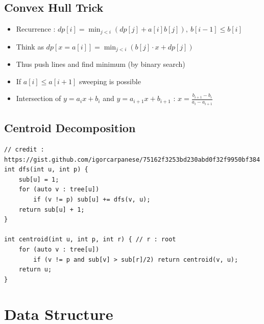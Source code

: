 \documentclass[landscape, 8pt, a4paper, oneside, twocolumn]{extarticle}
\newcommand{\added}{Should be \textcolor{red}{\textbf{added}}.}
\begin{document}
\subsection{Convex Hull Trick}
\begin{itemize}
\item Recurrence : $ dp[i] = \min_{j<i} (dp[j] + a[i]b[j]),\ b[i-1] \leq b[i] $
\item Think as $ dp[x = a[i]] = \min_{j<i}(b[j] \cdot x + dp[j]) $
\item Thus push lines and find minimum (by binary search)
\item If $ a[i] \leq a[i+1] $ sweeping is possible
\item Intersection of $ y = a_ix +b_i $ and $ y = a_{i+1}x + b_{i+1} $ : $ x = \frac{b_{i+1}-b_i}{a_i-a_{i+1}} $
\end{itemize}

\subsection{Centroid Decomposition}
\begin{verbatim}
// credit : https://gist.github.com/igorcarpanese/75162f3253bd230abd0f32f9950bf384
int dfs(int u, int p) {
    sub[u] = 1;
    for (auto v : tree[u])
        if (v != p) sub[u] += dfs(v, u);
    return sub[u] + 1;
}

int centroid(int u, int p, int r) { // r : root
    for (auto v : tree[u])
        if (v != p and sub[v] > sub[r]/2) return centroid(v, u);
    return u;
}
\end{verbatim}


\section{Data Structure}
\end{document}
